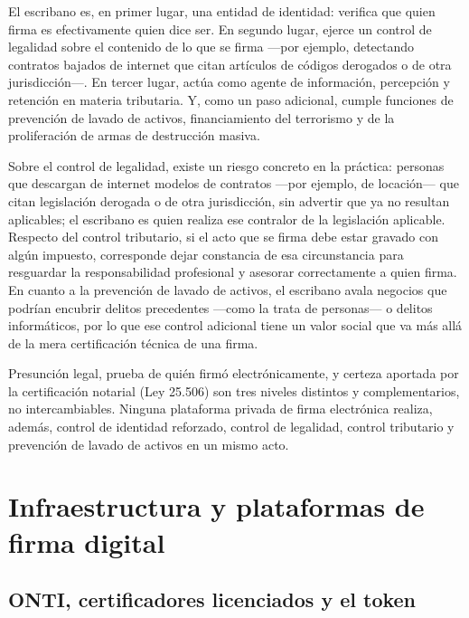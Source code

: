 \documentclass[12pt,oneside]{book}
\begin{document}
\begin{important}
El escribano es, en primer lugar, una entidad de identidad: verifica que quien firma es efectivamente quien dice ser. En segundo lugar, ejerce un control de legalidad sobre el contenido de lo que se firma ---por ejemplo, detectando contratos bajados de internet que citan artículos de códigos derogados o de otra jurisdicción---. En tercer lugar, actúa como agente de información, percepción y retención en materia tributaria. Y, como un paso adicional, cumple funciones de prevención de lavado de activos, financiamiento del terrorismo y de la proliferación de armas de destrucción masiva.
\end{important}

Sobre el control de legalidad, existe un riesgo concreto en la práctica: personas que descargan de internet modelos de contratos ---por ejemplo, de locación--- que citan legislación derogada o de otra jurisdicción, sin advertir que ya no resultan aplicables; el escribano es quien realiza ese contralor de la legislación aplicable. Respecto del control tributario, si el acto que se firma debe estar gravado con algún impuesto, corresponde dejar constancia de esa circunstancia para resguardar la responsabilidad profesional y asesorar correctamente a quien firma. En cuanto a la prevención de lavado de activos, el escribano avala negocios que podrían encubrir delitos precedentes ---como la trata de personas--- o delitos informáticos, por lo que ese control adicional tiene un valor social que va más allá de la mera certificación técnica de una firma.

\begin{important}
Presunción legal, prueba de quién firmó electrónicamente, y certeza aportada por la certificación notarial (Ley 25.506) son tres niveles distintos y complementarios, no intercambiables. Ninguna plataforma privada de firma electrónica realiza, además, control de identidad reforzado, control de legalidad, control tributario y prevención de lavado de activos en un mismo acto.
\end{important}

\section{Infraestructura y plataformas de firma digital}

\subsection{ONTI, certificadores licenciados y el token}
\end{document}
